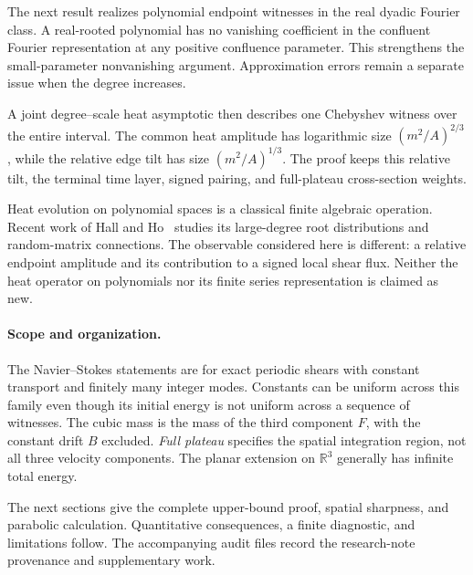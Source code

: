 \documentclass[11pt]{article}
\theoremstyle{definition}
\newcommand{\R}{\mathbb R}
\begin{document}
The next result realizes polynomial endpoint witnesses in the real
dyadic Fourier class. A real-rooted polynomial has no vanishing
coefficient in the confluent Fourier representation at any positive
confluence parameter. This strengthens the small-parameter
nonvanishing argument. Approximation errors remain a separate issue
when the degree increases.

A joint degree--scale heat asymptotic then describes one Chebyshev
witness over the entire interval. The common heat amplitude has
logarithmic size \((m^2/A)^{2/3}\), while the relative edge tilt has size
\((m^2/A)^{1/3}\). The proof keeps this relative tilt, the terminal time
layer, signed pairing, and full-plateau cross-section weights.

Heat evolution on polynomial spaces is a classical finite algebraic
operation. Recent work of Hall and Ho~\cite{HallHo2025} studies its
large-degree root distributions and random-matrix connections.
The observable considered here is different: a relative endpoint
amplitude and its contribution to a signed local shear flux.
Neither the heat operator on polynomials nor its finite series
representation is claimed as new.

\paragraph{Scope and organization.}
The Navier--Stokes statements are for exact periodic shears with
constant transport and finitely many integer modes. Constants can be
uniform across this family even though its initial energy is not
uniform across a sequence of witnesses. The cubic mass is the mass of
the third component \(F\), with the constant drift \(B\) excluded.
\emph{Full plateau} specifies the spatial integration region, not all
three velocity components. The planar extension on \(\R^3\) generally
has infinite total energy.

The next sections give the complete upper-bound proof, spatial
sharpness, and parabolic calculation. Quantitative consequences, a
finite diagnostic, and limitations follow. The accompanying audit
files record the research-note provenance and supplementary work.








\begingroup
\small
\setlength{\bibsep}{4pt}


\endgroup
\end{document}
